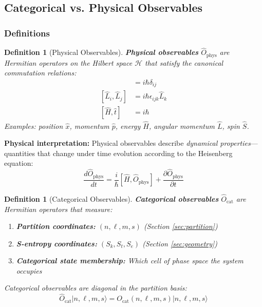 \documentclass[twocolumn,10pt]{article}
\newtheorem{definition}[theorem]{Definition}
\theoremstyle{remark}
\begin{document}
\subsection{Categorical vs. Physical Observables}

\subsubsection{Definitions}

\begin{definition}[Physical Observables]
\label{def:physical_observables}
\textbf{Physical observables} $\hat{O}_{\text{phys}}$ are Hermitian operators on the Hilbert space $\mathcal{H}$ that satisfy the canonical commutation relations:
\begin{align}
    [\hat{x}_i, \hat{p}_j] &= i\hbar \delta_{ij} \label{eq:CCR_position_momentum} \\
    [\hat{L}_i, \hat{L}_j] &= i\hbar \epsilon_{ijk} \hat{L}_k \label{eq:CCR_angular_momentum} \\
    [\hat{H}, \hat{t}] &= i\hbar \label{eq:CCR_energy_time}
\end{align}
Examples: position $\hat{x}$, momentum $\hat{p}$, energy $\hat{H}$, angular momentum $\hat{L}$, spin $\hat{S}$.
\end{definition}

\textbf{Physical interpretation:} Physical observables describe \textit{dynamical properties}—quantities that change under time evolution according to the Heisenberg equation:
\begin{equation}
    \frac{d\hat{O}_{\text{phys}}}{dt} = \frac{i}{\hbar}[\hat{H}, \hat{O}_{\text{phys}}] + \frac{\partial \hat{O}_{\text{phys}}}{\partial t}
    \label{eq:heisenberg_equation}
\end{equation}

\begin{definition}[Categorical Observables]
\label{def:categorical_observables}
\textbf{Categorical observables} $\hat{O}_{\text{cat}}$ are Hermitian operators that measure:
\begin{enumerate}
    \item \textbf{Partition coordinates:} $(n, \ell, m, s)$ (Section \ref{sec:partition})
    \item \textbf{S-entropy coordinates:} $(S_k, S_t, S_e)$ (Section \ref{sec:geometry})
    \item \textbf{Categorical state membership:} Which cell of phase space the system occupies
\end{enumerate}
Categorical observables are \textit{diagonal} in the partition basis:
\begin{equation}
    \hat{O}_{\text{cat}} |n, \ell, m, s\rangle = O_{\text{cat}}(n, \ell, m, s) |n, \ell, m, s\rangle
    \label{eq:categorical_diagonal}
\end{equation}
\end{definition}
\end{document}
